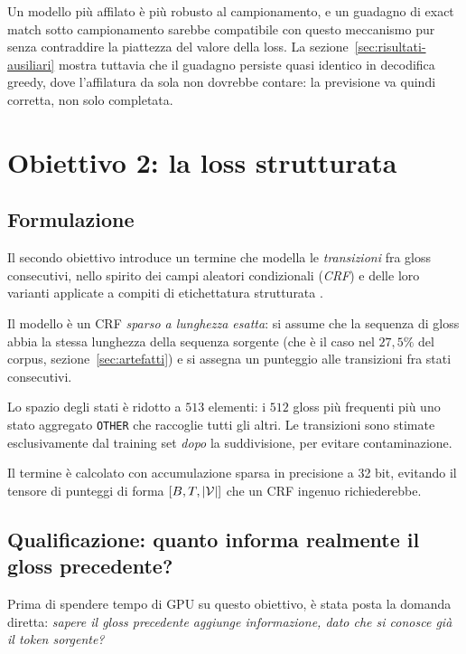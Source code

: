 Un modello più affilato è più robusto al campionamento, e un guadagno di exact
match sotto campionamento sarebbe compatibile con questo meccanismo pur senza
contraddire la piattezza del valore della loss. La sezione~\ref{sec:risultati-ausiliari}
mostra tuttavia che il guadagno persiste quasi identico in decodifica greedy,
dove l'affilatura da sola non dovrebbe contare: la previsione va quindi
corretta, non solo completata.

\section{Obiettivo 2: la loss strutturata}

\subsection{Formulazione}

Il secondo obiettivo introduce un termine che modella le \emph{transizioni} fra
gloss consecutivi, nello spirito dei campi aleatori condizionali (\emph{CRF}) e
delle loro varianti applicate a compiti di etichettatura strutturata
\cite{goyal2019global,huang2021global,zaratiana2023semicrf}.

Il modello è un CRF \emph{sparso a lunghezza esatta}: si assume che la sequenza
di gloss abbia la stessa lunghezza della sequenza sorgente (che è il caso nel
$27{,}5\%$ del corpus, sezione~\ref{sec:artefatti}) e si assegna un punteggio
alle transizioni fra stati consecutivi.

Lo spazio degli stati è ridotto a $513$ elementi: i $512$ gloss più frequenti
più uno stato aggregato \texttt{OTHER} che raccoglie tutti gli altri. Le
transizioni sono stimate esclusivamente dal training set \emph{dopo} la
suddivisione, per evitare contaminazione.

Il termine è calcolato con accumulazione sparsa in precisione a 32 bit, evitando
il tensore di punteggi di forma $[B, T, |\mathcal{V}|]$ che un CRF ingenuo
richiederebbe.

\subsection{Qualificazione: quanto informa realmente il gloss precedente?}

\label{sec:qualificazione-strutturale}

Prima di spendere tempo di GPU su questo obiettivo, è stata posta la domanda
diretta: \emph{sapere il gloss precedente aggiunge informazione, dato che si
conosce già il token sorgente?}

